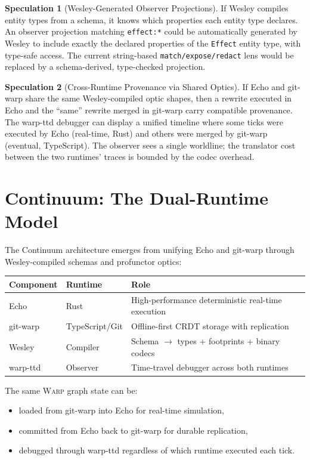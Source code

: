 \documentclass[11pt]{article}
\newcommand{\WARP}{\textsc{Warp}}
\theoremstyle{definition}
\newtheorem{speculation}{Speculation}
\begin{document}
\begin{speculation}[Wesley-Generated Observer Projections]
If Wesley compiles entity types from a schema, it knows which
properties each entity type declares. An observer projection matching
\texttt{effect:*} could be automatically generated by Wesley to
include exactly the declared properties of the \texttt{Effect} entity
type, with type-safe access. The current string-based
\texttt{match/expose/redact} lens would be replaced by a
schema-derived, type-checked projection.
\end{speculation}

\begin{speculation}[Cross-Runtime Provenance via Shared Optics]
If Echo and git-warp share the same Wesley-compiled optic shapes, then
a rewrite executed in Echo and the ``same'' rewrite merged in git-warp
carry compatible provenance. The warp-ttd debugger can display a
unified timeline where some ticks were executed by Echo (real-time,
Rust) and others were merged by git-warp (eventual, TypeScript). The
observer sees a single worldline; the translator cost between the two
runtimes' traces is bounded by the codec overhead.
\end{speculation}

\section{Continuum: The Dual-Runtime Model}

The Continuum architecture emerges from unifying Echo and git-warp
through Wesley-compiled schemas and profunctor optics:

\begin{center}
\begin{tabular}{@{}lll@{}}
\toprule
Component & Runtime & Role \\
\midrule
Echo & Rust & High-performance deterministic real-time execution \\
git-warp & TypeScript/Git & Offline-first CRDT storage with
  replication \\
Wesley & Compiler & Schema $\to$ types + footprints + binary codecs \\
warp-ttd & Observer & Time-travel debugger across both runtimes \\
\bottomrule
\end{tabular}
\end{center}

The same \WARP{} graph state can be:
\begin{itemize}[leftmargin=2em]
\item loaded from git-warp into Echo for real-time simulation,
\item committed from Echo back to git-warp for durable replication,
\item debugged through warp-ttd regardless of which runtime executed
  each tick.
\end{itemize}
\end{document}
